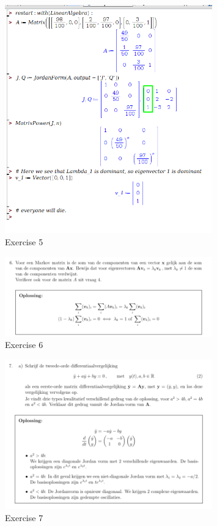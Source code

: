\documentclass[a4paper]{article}
\begin{document}
\begin{figure}[H]
	\centering
	\includegraphics[width=0.8\textwidth]{assets/huis_3_ex_5.png}
	\caption{Exercise 5}
	\label{fig:huis_3_ex_5}
\end{figure}

\begin{figure}[H]
	\centering
	\includegraphics[width=0.8\textwidth]{assets/huis_3_ex_6.png}
	\caption{Exercise 6}
	\label{fig:huis_3_ex_6}
\end{figure}

\begin{figure}[H]
	\centering
	\includegraphics[width=0.8\textwidth]{assets/huis_3_ex_7.png}
	\caption{Exercise 7}
	\label{fig:huis_3_ex_7}
\end{figure}
\end{document}
